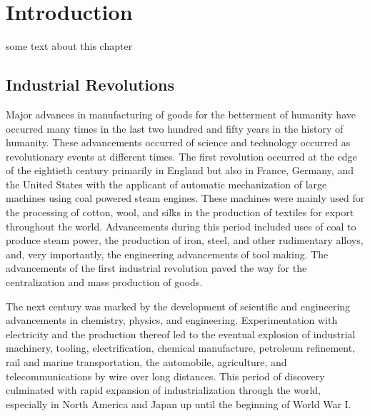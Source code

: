 \chapter{Introduction}\label{chapter:intro}


\chapterintro*

some text about this chapter~\cite{INTROSAMPLE}

\section{Industrial Revolutions}
Major advances in manufacturing of goods for the betterment of humanity have occurred many times in the last two hundred and fifty years in the history of humanity.  These advancements occurred of science and technology occurred as revolutionary events at different times.  The first revolution occurred at the edge of the eightieth century primarily in England but also in France, Germany, and the United States with the applicant of automatic mechanization of large machines using coal powered steam engines.  These machines were mainly used for the processing of cotton, wool, and silks in the production of textiles for export throughout the world.  Advancements during this period included uses of coal to produce steam power, the production of iron, steel, and other rudimentary alloys, and, very importantly, the engineering advancements of tool making.  The advancements of the first industrial revolution paved the way for the centralization and mass production of goods.

The next century was marked by the development of scientific and engineering advancements in chemistry, physics, and engineering. Experimentation with electricity and the production thereof led to the eventual explosion of industrial machinery, tooling, electrification, chemical manufacture, petroleum refinement, rail and marine transportation, the automobile, agriculture, and telecommunications by wire over long distances.  This period of discovery culminated with rapid expansion of industrialization through the world, especially in North America and Japan up until the beginning of World War I.


